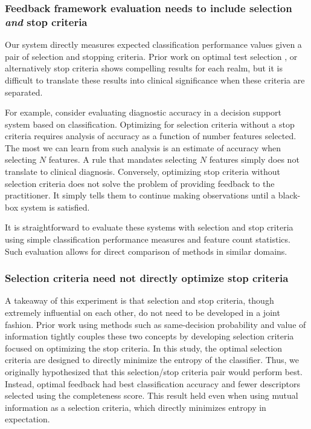 \subsubsection{Feedback framework evaluation needs to include selection \emph{and} stop criteria}
Our system directly measures expected classification performance values given a pair of selection and stopping criteria.
Prior work on  optimal test selection \cite{Greiner:2002wr,Madigan:1996cv, Krause:2005tr}, or alternatively stop criteria \cite{Gaag:2011gs} shows compelling results for each realm, but it is difficult to translate these results into clinical significance when these criteria are separated.

For example, consider evaluating diagnostic accuracy in a decision support system based on classification.
Optimizing for selection criteria without a stop criteria requires analysis of accuracy as a function of number features selected.
The most we can learn from such analysis is an estimate of accuracy when selecting $N$ features.
A rule that mandates selecting $N$ features simply does not translate to clinical diagnosis.
Conversely, optimizing stop criteria without selection criteria does not solve the problem of providing feedback to the practitioner.
It simply tells them to continue making observations until a black-box system is satisfied.

It is straightforward to evaluate these systems with selection and stop criteria using simple classification performance measures and feature count statistics.
Such evaluation allows for direct comparison of methods in similar domains.


\subsubsection{Selection criteria need not directly optimize stop criteria}
A takeaway of this experiment is that selection and stop criteria, though extremely influential on each other, do not need to be developed in a joint fashion.
Prior work using methods such as same-decision probability \cite{Choi:2012id} and value of information \cite{Heckerman:1992uq} tightly couples these two concepts by developing selection criteria focused on optimizing the stop criteria.
In this study, the optimal selection criteria are designed to directly minimize the entropy of the classifier.
Thus, we originally hypothesized that this selection/stop criteria pair would perform best.
Instead, optimal feedback had best classification accuracy and fewer descriptors selected using the completeness score.
This result held even when using mutual information as a selection criteria, which directly minimizes entropy in expectation.


